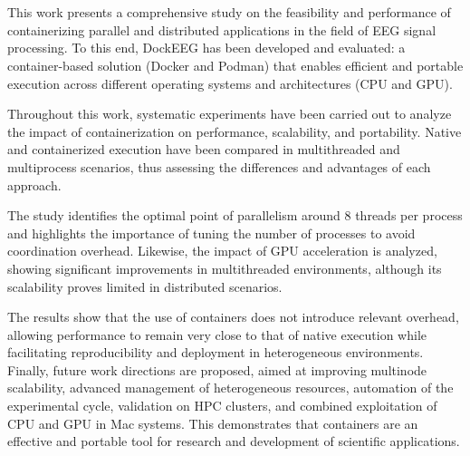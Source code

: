 \cleardoublepage


\thispagestyle{empty}

\\

\vspace{0.7cm}
\\

This work presents a comprehensive study on the feasibility and performance of containerizing parallel and distributed applications in the field of EEG signal processing. To this end, DockEEG has been developed and evaluated: a container-based solution (Docker and Podman) that enables efficient and portable execution across different operating systems and architectures (CPU and GPU).

Throughout this work, systematic experiments have been carried out to analyze the impact of containerization on performance, scalability, and portability. Native and containerized execution have been compared in multithreaded and multiprocess scenarios, thus assessing the differences and advantages of each approach.

The study identifies the optimal point of parallelism around 8 threads per process and highlights the importance of tuning the number of processes to avoid coordination overhead. Likewise, the impact of GPU acceleration is analyzed, showing significant improvements in multithreaded environments, although its scalability proves limited in distributed scenarios.

The results show that the use of containers does not introduce relevant overhead, allowing performance to remain very close to that of native execution while facilitating reproducibility and deployment in heterogeneous environments. Finally, future work directions are proposed, aimed at improving multinode scalability, advanced management of heterogeneous resources, automation of the experimental cycle, validation on HPC clusters, and combined exploitation of CPU and GPU in Mac systems. This demonstrates that containers are an effective and portable tool for research and development of scientific applications.

\chapter*{}
\thispagestyle{empty}

